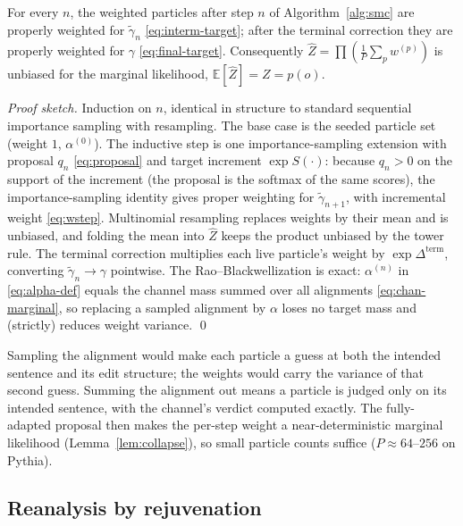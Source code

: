 \documentclass[11pt]{article}
\begin{document}
\begin{theorem}\label{thm:smc}
For every $n$, the weighted particles after step $n$ of Algorithm~\ref{alg:smc} are properly weighted for $\tilde\gamma_n$ \eqref{eq:interm-target}; after the terminal correction they are properly weighted for $\gamma$ \eqref{eq:final-target}. Consequently $\widehat Z = \prod (\tfrac1P\sum_p w^{(p)})$ is unbiased for the marginal likelihood, $\mathbb E[\widehat Z] = Z = p(o)$.
\end{theorem}
\begin{proof}[Proof sketch]
Induction on $n$, identical in structure to standard sequential importance sampling with resampling. The base case is the seeded particle set (weight $1$, $\alpha^{(0)}$). The inductive step is one importance-sampling extension with proposal $q_n$ \eqref{eq:proposal} and target increment $\exp S(\cdot)$: because $q_n>0$ on the support of the increment (the proposal is the softmax of the same scores), the importance-sampling identity gives proper weighting for $\tilde\gamma_{n+1}$, with incremental weight \eqref{eq:wstep}. Multinomial resampling replaces weights by their mean and is unbiased, and folding the mean into $\widehat Z$ keeps the product unbiased by the tower rule. The terminal correction multiplies each live particle's weight by $\exp\Delta^{\mathrm{term}}$, converting $\tilde\gamma_n \to \gamma$ pointwise. The Rao--Blackwellization is exact: $\alpha^{(n)}$ in \eqref{eq:alpha-def} equals the channel mass summed over all alignments \eqref{eq:chan-marginal}, so replacing a sampled alignment by $\alpha$ loses no target mass and (strictly) reduces weight variance. \qed
\end{proof}

\begin{remark}
Sampling the alignment would make each particle a guess at both the intended sentence and its edit structure; the weights would carry the variance of that second guess. Summing the alignment out means a particle is judged only on its intended sentence, with the channel's verdict computed exactly. The fully-adapted proposal then makes the per-step weight a near-deterministic marginal likelihood (Lemma~\ref{lem:collapse}), so small particle counts suffice ($P\!\approx\!64$--$256$ on Pythia).
\end{remark}

\subsection{Reanalysis by rejuvenation}
\label{sec:rejuv}
\end{document}
